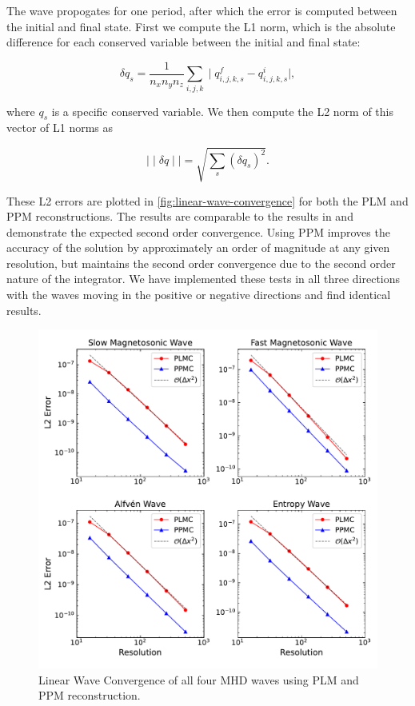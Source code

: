 The wave propogates for one period, after which the error is computed between the initial and final state. First we compute the L1 norm, which is the absolute difference for each conserved variable between the initial and final state:

\begin{equation}
    \delta q_s = \frac{1}{n_x n_y n_z} \sum_{i,j,k} \mid q^f_{i,j,k,s} - q^i_{i,j,k,s} \mid,
\end{equation}

\noindent where $q_s$ is a specific conserved variable. We then compute the L2 norm of this vector of L1 norms as

\begin{equation}
    \mid \mid \delta q \mid \mid = \sqrt{\sum_s \left( \delta q_s \right)^2}.
\end{equation}

These L2 errors are plotted in \autoref{fig:linear-wave-convergence} for both the PLM and PPM reconstructions. The results are comparable to the results in \cite{stone_2009} and demonstrate the expected second order convergence. Using PPM improves the accuracy of the solution by approximately an order of magnitude at any given resolution, but maintains the second order convergence due to the second order nature of the integrator. We have implemented these tests in all three directions with the waves moving in the positive or negative directions and find identical results.

\begin{figure}[ht!]
    \includegraphics[width=\linewidth]{assets/3-mhd-tests/linear_convergence.pdf}
    \caption{Linear Wave Convergence of all four MHD waves using PLM and PPM reconstruction. }
    \label{fig:linear-wave-convergence}
\end{figure}

